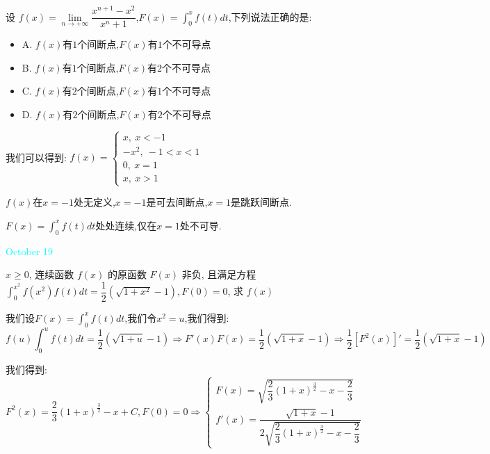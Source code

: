 \begin{example}[][Exam: 36.3.8]
	设 $f(x)=\lim\limits_{n\to+\infty}\dfrac{x^{n+1}-x^2}{x^n+1}$,$F(x)=\int_{0}^{x}f(t)dt$,下列说法正确的是:  
\begin{itemize}
	\item A. $f(x)$有$1$个间断点,$F(x)$有$1$个不可导点
	\item B. $f(x)$有$1$个间断点,$F(x)$有$2$个不可导点
	\item C. $f(x)$有$2$个间断点,$F(x)$有$1$个不可导点
	\item D. $f(x)$有$2$个间断点,$F(x)$有$2$个不可导点
\end{itemize}
\end{example}

\begin{solution}

	我们可以得到:  $f(x)=\left\lbrace
	\begin{array}{l}
		x,\ x<-1\\
		-x^2,\ -1<x<1\\
		0,\ x=1\\
		x,\ x>1
	\end{array}
	\right. $
	
	$f(x)$在$x=-1$处无定义,$x=-1$是可去间断点,$x=1$是跳跃间断点.
	
	$F(x)=\int_{0}^{x}f(t)dt$处处连续,仅在$x=1$处不可导.
\end{solution}


\textcolor{cyan}{October 19}

\begin{example}[][Exam: 36.3.9]
	$x\geq 0$, 连续函数 $f(x)$ 的原函数 $F(x)$ 非负, 且满足方程$\int_{0}^{x^2}f(x^2)f(t)dt=\dfrac{1}{2}(\sqrt{1+x^2}-1), F(0)=0$, 求 $f(x)$
\end{example} 
\begin{solution}

	我们设$F(x)=\int_{0}^{x}f(t)dt$,我们令$x^2=u$,我们得到:  
	$$f(u)\int_{0}^{u}f(t)dt=\dfrac{1}{2}(\sqrt{1+u}-1)\Rightarrow F'(x)F(x)=\dfrac{1}{2}(\sqrt{1+x}-1)\Rightarrow \dfrac{1}{2}[F^2(x)]'=\dfrac{1}{2}(\sqrt{1+x}-1)$$
	
	我们得到:  
	$$F^2(x)=\dfrac{2}{3}(1+x)^{\frac{3}{2}}-x+C,F(0)=0\Rightarrow \left\lbrace
	\begin{array}{l}
		F(x)=\sqrt{\dfrac{2}{3}(1+x)^{\frac{3}{2}}-x-\dfrac{2}{3}}\\
		f'(x)=\dfrac{\sqrt{1+x}-1}{2\sqrt{\dfrac{2}{3}(1+x)^{\frac{3}{2}}-x-\dfrac{2}{3}}}
	\end{array}
	\right. $$
\end{solution}

